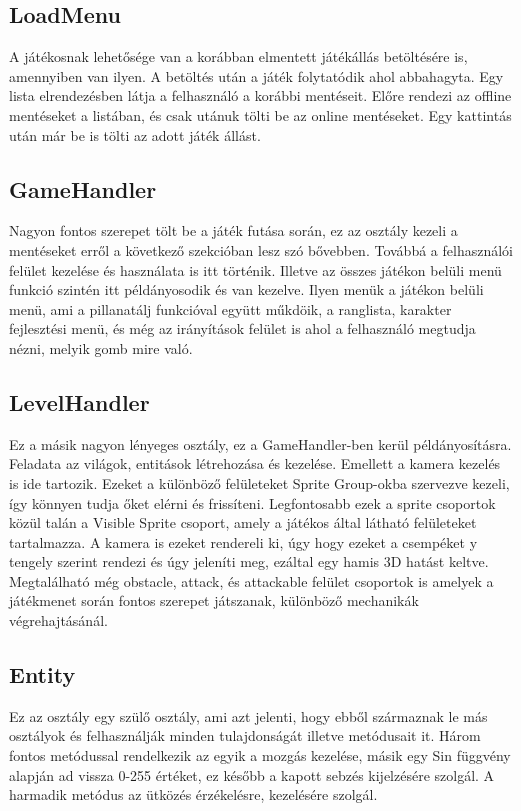\subsection{LoadMenu}
A játékosnak lehetősége van a korábban elmentett játékállás betöltésére is, amennyiben van ilyen. A betöltés után a játék folytatódik ahol abbahagyta. Egy lista elrendezésben látja a felhasználó a korábbi mentéseit. Előre rendezi az offline mentéseket a listában, és csak utánuk tölti be az online mentéseket. Egy kattintás után már be is tölti az adott játék állást.


\subsection{GameHandler}
Nagyon fontos szerepet tölt be a játék futása során, ez az osztály kezeli a mentéseket erről a következő szekcióban lesz szó bővebben. 
Továbbá a felhasználói felület kezelése és használata is itt történik. Illetve az összes játékon belüli menü funkció szintén itt példányosodik és van kezelve. Ilyen menük a játékon belüli menü, ami a pillanatálj funkcióval együtt műkdöik, a ranglista, karakter fejlesztési menü, és még az irányítások felület is ahol a felhasználó megtudja nézni, melyik gomb mire való.

\subsection{LevelHandler}
Ez a másik nagyon lényeges osztály, ez a GameHandler-ben kerül példányosításra. Feladata az világok, entitások létrehozása és kezelése. Emellett a kamera kezelés is ide tartozik. 
Ezeket a különböző felületeket Sprite Group-okba szervezve kezeli, így könnyen tudja őket elérni és frissíteni.
Legfontosabb ezek a sprite csoportok közül talán a Visible Sprite csoport, amely a játékos által látható felületeket tartalmazza. A kamera is ezeket rendereli ki, úgy hogy ezeket a csempéket y tengely szerint rendezi és úgy jeleníti meg, ezáltal egy hamis 3D hatást keltve.
Megtalálható még obstacle, attack, és attackable felület csoportok is amelyek a játékmenet során fontos szerepet játszanak, különböző mechanikák végrehajtásánál.


\subsection{Entity}
Ez az osztály egy szülő osztály, ami azt jelenti, hogy ebből származnak le más osztályok és felhasználják minden tulajdonságát illetve metódusait it.  
Három fontos metódussal rendelkezik az egyik a mozgás kezelése, másik egy Sin függvény alapján ad vissza 0-255 értéket, ez később a kapott sebzés kijelzésére szolgál. A harmadik metódus az ütközés érzékelésre, kezelésére szolgál.

